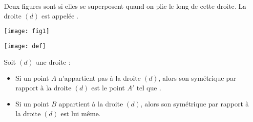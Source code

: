 \begin{mydef}
	Deux figures sont  si elles se superposent quand on plie le long de cette droite. 
	La droite $(d)$ est appelée .

\end{mydef}




\begin{myex}
	\begin{center}
		\texttt{[image: fig1]}
	\end{center}	
\end{myex}

\begin{multicols}{2}
	
	\begin{center}
		\texttt{[image: def]}
	\end{center}
	
	\begin{myprops}
		Soit $(d)$ une droite :
		\begin{itemize}
			\item Si un point $A$ n'appartient pas à la droite $(d)$, alors son symétrique par rapport à la droite $(d)$ est le point $A'$ tel que .
			\item Si un point $B$ appartient à la droite $(d)$, alors son symétrique par rapport à la droite $(d)$ est lui même.
		\end{itemize}
	\end{myprops}
	
	
\end{multicols}
